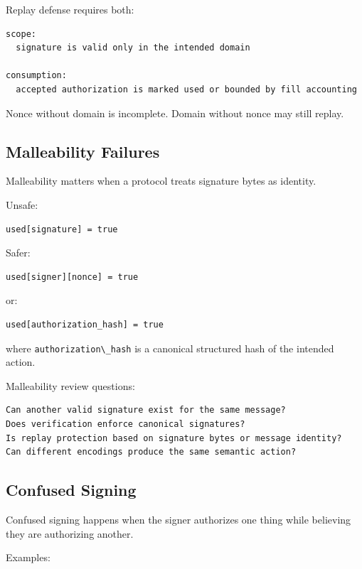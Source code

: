 Replay defense requires both:

\begin{lstlisting}
scope:
  signature is valid only in the intended domain

consumption:
  accepted authorization is marked used or bounded by fill accounting
\end{lstlisting}

Nonce without domain is incomplete. Domain without nonce may still
replay.

\subsection{Malleability Failures}

Malleability matters when a protocol treats signature bytes as identity.

Unsafe:

\begin{lstlisting}
used[signature] = true
\end{lstlisting}

Safer:

\begin{lstlisting}
used[signer][nonce] = true
\end{lstlisting}

or:

\begin{lstlisting}
used[authorization_hash] = true
\end{lstlisting}

where \passthrough{\lstinline!authorization\_hash!} is a canonical
structured hash of the intended action.

Malleability review questions:

\begin{lstlisting}
Can another valid signature exist for the same message?
Does verification enforce canonical signatures?
Is replay protection based on signature bytes or message identity?
Can different encodings produce the same semantic action?
\end{lstlisting}

\subsection{Confused Signing}

Confused signing happens when the signer authorizes one thing while
believing they are authorizing another.

Examples:

